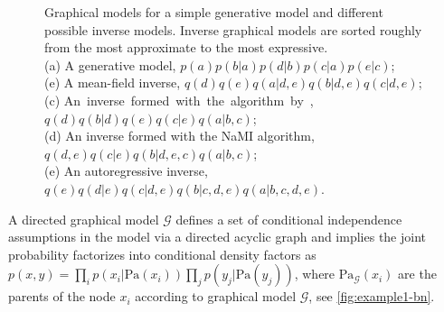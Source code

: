 \documentclass[12pt]{article}
\begin{document}
\begin{figure}[H]
\centering
\begin{subfigure}[b]{0.19\linewidth}
    \centering
    
    \caption{}
    \label{fig:example1-bn}
\end{subfigure}
\begin{subfigure}[b]{0.19\linewidth}
    \centering
    
    \caption{}
    \label{fig:example1-mf}
\end{subfigure}
\begin{subfigure}[b]{0.19\linewidth}
    \centering
    
    \caption{}
    \label{fig:example1-brooks}
\end{subfigure}
\begin{subfigure}[b]{0.19\linewidth}
    \centering
    
    \caption{}
    \label{fig:example1-inverse}
\end{subfigure}
\begin{subfigure}[b]{0.19\linewidth}
    \centering
    
    \caption{}
    \label{fig:example1-ar}
\end{subfigure}
\caption[Simple examples]{
Graphical models for a simple generative model and different possible inverse models. 
Inverse graphical models are sorted roughly from the most approximate to the most expressive.\\
(a) A generative model,  $p(a)p(b|a)p(d|b)p(c|a)p(e|c)$; \\
(e) A mean-field inverse, $q(d)q(e)q(a|d,e)q(b|d,e)q(c|d,e)$;\\
(c) \mbox{An inverse formed with the algorithm by \citet{StuhlmullerEtAl2013}, $q(d)q(b|d)q(e)q(c|e)q(a|b,c)$;}\\
(d) An inverse formed with the NaMI algorithm,
$q(d,e)q(c|e)q(b|d,e,c)q(a|b,c)$;\\
(e) An autoregressive inverse, $q(e)q(d|e)q(c|d,e)q(b|c,d,e)q(a|b,c,d,e)$.
}
\label{fig:example1}
\end{figure}

A directed graphical model $\mathcal{G}$ defines a set of conditional independence assumptions in the model via a directed acyclic graph \citep{KollerFriedman2009}
and implies the joint probability factorizes into conditional density factors as
$p(x,y)=\prod_i p(x_i|\text{Pa}(x_i)) \prod_j p(y_j|\text{Pa}(y_j))$,
where $\text{Pa}_\mathcal{G}(x_i)$ are the parents of the node $x_i$ according to graphical model $\mathcal{G}$, see \autoref{fig:example1-bn}.
\end{document}
